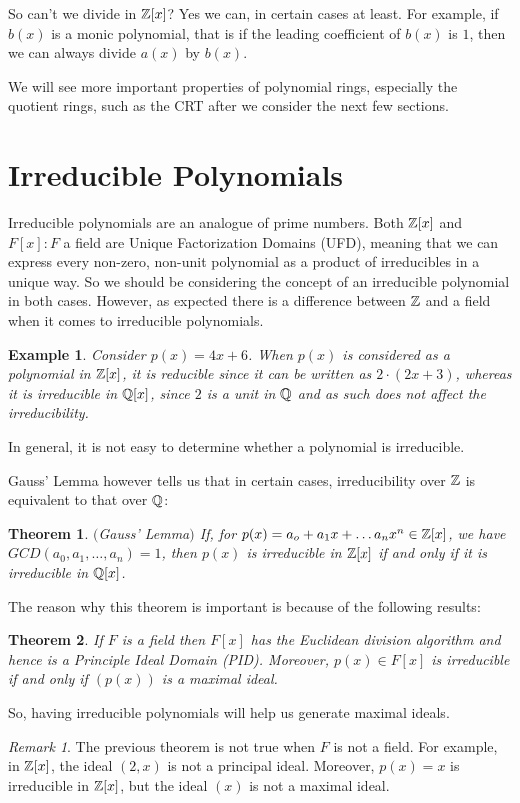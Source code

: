 \documentclass[12pt]{article}
\theoremstyle{plain}
\newtheorem{example}{Example}
\newtheorem{theorem}{Theorem}
\theoremstyle{definition}
\theoremstyle{remark}
\newtheorem{remark}{Remark}
\begin{document}
So can't we divide in $\mathbb{Z}[x]$? Yes we can, in certain cases at least. For example, if $b(x)$ is a monic polynomial, that is if the leading coefficient of $b(x)$ is $1$, then we can always divide $a(x)$ by $b(x)$.

We will see more important properties of polynomial rings, especially the quotient rings, such as the CRT after we consider the next few sections.
\section{Irreducible Polynomials} Irreducible polynomials are an analogue of prime numbers. Both $\mathbb{Z}[x]$ and $F[x]: F$ a field are Unique Factorization Domains (UFD), meaning that we can express every non-zero, non-unit polynomial as a product of irreducibles in a unique way. So we should be considering the concept of an irreducible polynomial in both cases. However, as expected there is a difference between $\mathbb{Z}$ and a field when it comes to irreducible polynomials.
\begin{example}
Consider $p(x)=4x+6$. When $p(x)$ is considered as a polynomial in $\mathbb{Z}[x]$, it is reducible since it can be written as $2\cdot (2x+3)$, whereas it is irreducible in $\mathbb{Q}[x]$, since $2$ is a unit in $\mathbb{Q}$ and as such does not affect the irreducibility.
\end{example}
In general, it is not easy to determine whether a polynomial is irreducible.

Gauss' Lemma however tells us that in certain cases, irreducibility over $\mathbb{Z}$ is equivalent to that over $\mathbb{Q}$:
\begin{theorem}$($Gauss' Lemma$)$
If, for $p(x)=a_o+a_1x+\dots a_nx^n \in \mathbb{Z}[x]$, we have
$GCD(a_0, a_1, \dots, a_n)=1$, then $p(x)$ is irreducible in $\mathbb{Z}[x]$ if and only if it is irreducible in $\mathbb{Q}[x]$.
\end{theorem}
The reason why this theorem is important is because of the following results:
\begin{theorem}\label{irmax}
If $F$ is a field then $F[x]$ has the Euclidean division algorithm and hence is a Principle Ideal Domain (PID). Moreover, $p(x)\in F[x]$ is irreducible if and only if $(p(x))$ is a maximal ideal.
\end{theorem}
So, having irreducible polynomials will help us generate maximal ideals.
\begin{remark}
The previous theorem is not true when $F$ is not a field. For example, in $\mathbb{Z}[x]$, the ideal $(2,x)$ is not a principal ideal. Moreover, $p(x) = x$ is irreducible in $\mathbb{Z}[x]$, but the ideal $(x)$ is not a maximal ideal.
\end{remark}
\end{document}
